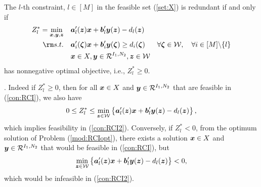 \documentclass[fleqn,mnsc,blindrev]{informs4}
\newcommand{\mb}[1]{\mbox{\boldmath \ensuremath{#1}}}
\newcommand{\mbs}[1]{\mb{\scriptstyle{#1}}}
\begin{document}
		\begin{theorem} \label{thm:RCIExact}
			The $l$-th constraint, $l \in [M]$  in the feasible set (\ref{set:X}) is redundant if and only if
\begin{equation} \label{mod:RCIopt}
				\begin{aligned} 
					Z^*_l=	\min_{ \boldsymbol{x}  , \boldsymbol{y}, \boldsymbol{z}} \quad & \mb{a}'_l(\mb{z})\mb{x}+\mb{b}'_l \mb{y}(\mb{z}) - d_l(\mb{z}) \\
					{\rm s.t.}  \quad &\mb{a}'_i(\mb{\zeta})\mb{x}+\mb{b}'_i \mb{y}(\mb{\zeta}) \geq d_i(\mb{\zeta}) &  \forall  \mb{\zeta} \in  \mathcal{W}, \quad \forall i  \in [M] \backslash \{l\} \\
					\quad & \boldsymbol{x} \in X, \boldsymbol{y} \in   \mathcal{R}^{I_1,N_2},  \mb{z} \in \mathcal{W}
				\end{aligned}
\end{equation}
			has nonnegative optimal objective, i.e.,  $Z^*_l\geq 0$. 
		\end{theorem}
		. 
		Indeed if  $Z^*_l\geq 0$, then for  all $\mb{x} \in X$ and $\mb{y}\in \mathcal{R}^{I_1,N_2}$ that are feasible in (\ref{con:RCI}), we also have
\begin{equation*}
		0 \le  Z^*_l  \le  \min_{\mbs{z} \in \mathcal{W}}  \left\{  \mb{a}'_l(\mb{z})\mb{x}+\mb{b}'_l \mb{y}(\mb{z}) - d_l(\mb{z})  \right\},
\end{equation*}
		which implies feasibility in (\ref{con:RCI2}). Conversely, if $Z^*_l <0$, from the optimum solution of  Problem (\ref{mod:RCIopt}), there exists  a solution  $\mb{x} \in X$ and $\mb{y} \in \mathcal{R}^{I_1,N_2}$ that would be feasible in (\ref{con:RCI}), but\vadjust{\pagebreak}
\begin{equation*}
		\min_{\mbs{z} \in \mathcal{W}} \left\{  \mb{a}'_l(\mb{z})\mb{x}+\mb{b}'_l \mb{y}(\mb{z}) - d_l(\mb{z}) \right\} < 0, 
\end{equation*}
		which would be infeasible in (\ref{con:RCI2}).
		 \hfill \Halmos\\
		
\end{document}
